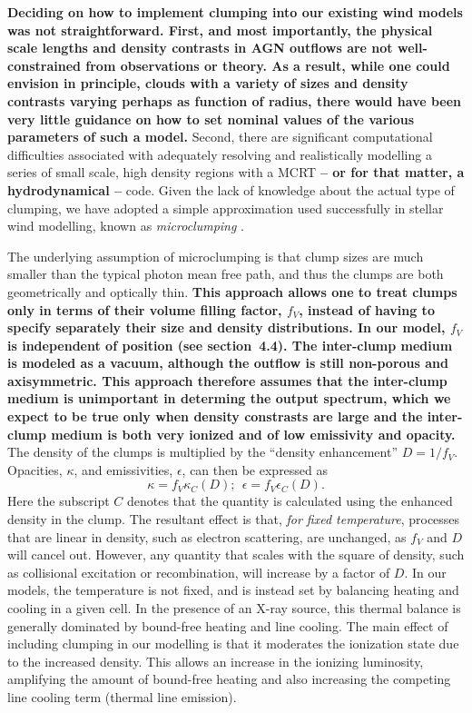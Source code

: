 \documentclass[useAMS,usenatbib]{mn2e_x}
\begin{document}
{\bf Deciding on how to implement clumping into our existing wind models was not straightforward.
First, and most importantly, the physical scale lengths and density contrasts in AGN outflows are not well-constrained from observations or theory.  As a result, while one could envision in principle, clouds with a variety of sizes and density contrasts varying perhaps as function of radius, there would have been very little guidance on how to set nominal values of the various parameters of such a model.}  
Second, there are significant computational difficulties associated with adequately resolving and realistically modelling a series of small scale, high density regions with a MCRT
{\bf -- or for that matter, a hydrodynamical --} code. 
Given the lack of knowledge about the actual type of clumping, we have adopted
a simple approximation used successfully in stellar wind modelling, known as 
{\em microclumping} \citep[e.g.][]{hamann1998,hilliermiller1999,hamann2008}.  

The underlying assumption of microclumping is that clump sizes are much smaller than the 
typical photon mean free path, and thus the clumps are 
both geometrically and optically thin. {\bf This approach 
allows one to treat clumps only in terms of their volume filling factor, $f_V$, 
instead of having to specify separately their size and density distributions.
In our model, $f_V$ is independent of position (see section~4.4).
The inter-clump medium is modeled as a vacuum,
although the outflow is still non-porous and axisymmetric.
This approach therefore assumes that the inter-clump medium
is unimportant in determing the output spectrum, which
we expect to be true only when density constrasts are large and
the inter-clump medium is both very ionized and of low emissivity and opacity.
}
The density of the clumps is multiplied by the ``density enhancement'' 
$D=1/f_V$. Opacities, $\kappa$, and emissivities, $\epsilon$, 
can then be expressed as 
\begin{equation}
\kappa = f_V \kappa_C(D);~~\epsilon = f_V \epsilon_C(D).
\end{equation}
Here the subscript $C$ denotes that the quantity is calculated using the 
enhanced density in the clump. The resultant effect is that, {\em for fixed temperature},
processes that are linear in density, such as electron scattering, are unchanged, 
as $f_V$ and $D$ will cancel out. However, any quantity that scales with the square of density, 
such as collisional excitation or recombination, will increase by a factor of $D$.
In our models, the temperature is not fixed, and is instead set by balancing heating and 
cooling in a given cell. In the presence of an X-ray source, this thermal balance is 
generally dominated by bound-free heating and line cooling. The main effect of including 
clumping in our modelling is that it moderates the ionization state due to the increased 
density. This allows an increase in the ionizing luminosity, amplifying the amount of
bound-free heating and also increasing the competing line cooling term
(thermal line emission).
\end{document}
